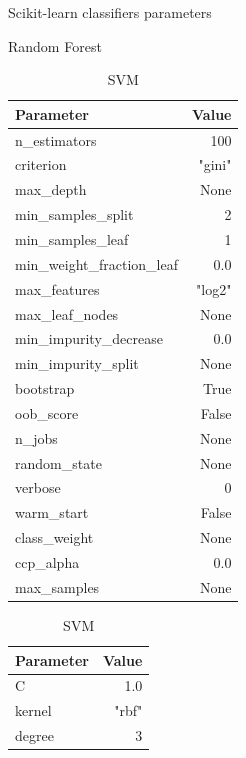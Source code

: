 \begin{table}[H]
    \caption{Scikit-learn classifiers parameters} \label{tab:sklearn_params}
    \scriptsize
    \centering
    \begin{subtable}[t]{.33\linewidth}
        \caption{Random Forest \cite{noauthor_sklearnensemblerandomforestclassifier_nodate}}
        \centering
        \begin{tabular}{lr}\toprule
            Parameter & Value \\\midrule
            n\_estimators & 100 \\
            criterion & "gini" \\
            max\_depth & None \\
            min\_samples\_split & 2 \\
            min\_samples\_leaf & 1 \\
            min\_weight\_fraction\_leaf & 0.0 \\
            max\_features & "log2" \\
            max\_leaf\_nodes & None \\
            min\_impurity\_decrease & 0.0 \\
            min\_impurity\_split & None \\
            bootstrap & True \\
            oob\_score & False \\
            n\_jobs & None \\
            random\_state & None \\
            verbose & 0 \\
            warm\_start & False \\
            class\_weight & None \\
            ccp\_alpha & 0.0 \\
            max\_samples & None \\\bottomrule
        \end{tabular}
    \end{subtable}%
    \begin{subtable}[t]{.35\linewidth}
        \caption{SVM \cite{noauthor_sklearnsvmsvc_nodate}}
        \centering
        \begin{tabular}{lr}\toprule
            Parameter & Value \\\midrule
            C & 1.0 \\
            kernel & "rbf" \\
            degree & 3 \\

\end{tabular}
\end{subtable}
\end{table}

